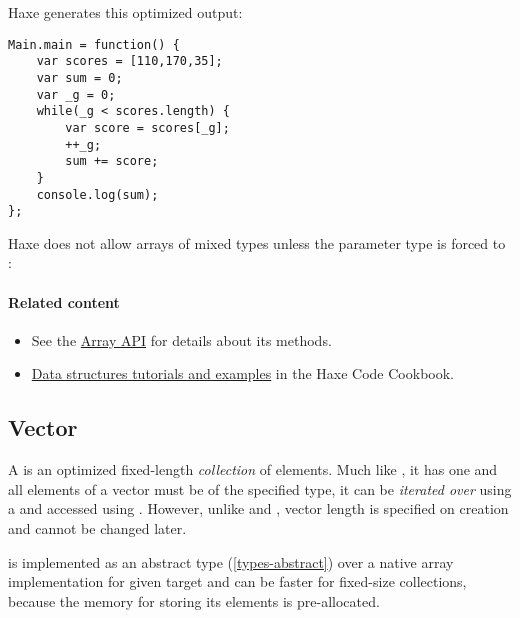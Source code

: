 
Haxe generates this optimized  output:

\begin{lstlisting}
Main.main = function() {
	var scores = [110,170,35];
	var sum = 0;
	var _g = 0;
	while(_g < scores.length) {
		var score = scores[_g];
		++_g;
		sum += score;
	}
	console.log(sum);
};
\end{lstlisting}

Haxe does not allow arrays of mixed types unless the parameter type is forced to :



\paragraph{Related content}
\begin{itemize}
	\item See the \href{https://api.haxe.org/Array.html}{Array API} for details about its methods. 
	\item \href{http://code.haxe.org/category/data-structures/}{Data structures tutorials and examples} in the Haxe Code Cookbook.
\end{itemize} 

\subsection{Vector}
\label{std-vector}

A  is an optimized fixed-length \emph{collection} of elements. Much like , it has one  and all elements of a vector must be of the specified type, it can be \emph{iterated over} using a  and accessed using . However, unlike  and , vector length is specified on creation and cannot be changed later.


 is implemented as an abstract type (\ref{types-abstract}) over a native array implementation for given target and can be faster for fixed-size collections, because the memory for storing its elements is pre-allocated.

